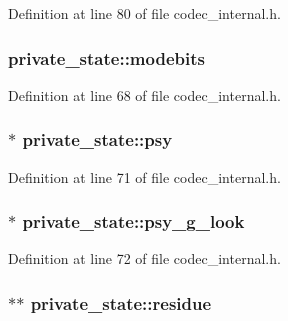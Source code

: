 Definition at line 80 of file codec\+\_\+internal.\+h.

\subsubsection[{\texorpdfstring{modebits}{modebits}}]{ private\+\_\+state\+::modebits}\hypertarget{structprivate__state_a3178cdb14e6be6dc5673637d187f8a7b}{}\label{structprivate__state_a3178cdb14e6be6dc5673637d187f8a7b}


Definition at line 68 of file codec\+\_\+internal.\+h.

\subsubsection[{\texorpdfstring{psy}{psy}}]{$\ast$ private\+\_\+state\+::psy}\hypertarget{structprivate__state_a26015e60330f92d6d303c0db9c712287}{}\label{structprivate__state_a26015e60330f92d6d303c0db9c712287}


Definition at line 71 of file codec\+\_\+internal.\+h.

\subsubsection[{\texorpdfstring{psy\+\_\+g\+\_\+look}{psy_g_look}}]{$\ast$ private\+\_\+state\+::psy\+\_\+g\+\_\+look}\hypertarget{structprivate__state_a1e3418326bf4a86cad24212d9af52b3d}{}\label{structprivate__state_a1e3418326bf4a86cad24212d9af52b3d}


Definition at line 72 of file codec\+\_\+internal.\+h.

\subsubsection[{\texorpdfstring{residue}{residue}}]{$\ast$$\ast$ private\+\_\+state\+::residue}\hypertarget{structprivate__state_a4a336f98a934f3810f0cba19a597bb45}{}\label{structprivate__state_a4a336f98a934f3810f0cba19a597bb45}


